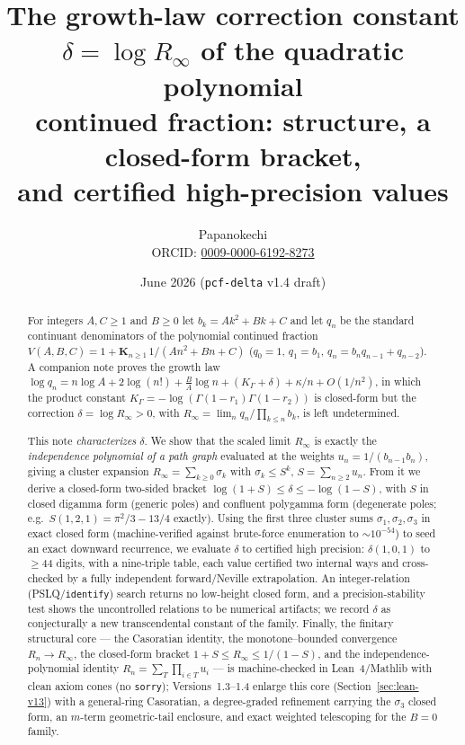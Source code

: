 \documentclass[11pt]{article}
\title{The growth-law correction constant\\
$\delta=\log R_\infty$ of the quadratic polynomial\\
continued fraction: structure, a closed-form bracket,\\
and certified high-precision values}
\author{Papanokechi\\
\small ORCID: \href{https://orcid.org/0009-0000-6192-8273}{0009-0000-6192-8273}}
\date{June 2026 \quad(\texttt{pcf-delta} v1.4 draft)}
\newcommand{\Rinf}{R_\infty}
\begin{document}
\maketitle

\begin{abstract}
For integers $A,C\ge1$ and $B\ge0$ let $b_k=Ak^2+Bk+C$ and let $q_n$ be the standard
continuant denominators of the polynomial continued fraction
$V(A,B,C)=1+\mathbf{K}_{n\ge1}\,1/(An^2+Bn+C)$ ($q_0=1$, $q_1=b_1$,
$q_n=b_nq_{n-1}+q_{n-2}$). A companion note proves the growth law
$\log q_n=n\log A+2\log(n!)+\tfrac{B}{A}\log n+(K_\Gamma+\delta)+\kappa/n+O(1/n^2)$,
in which the product constant $K_\Gamma=-\log(\Gamma(1-r_1)\Gamma(1-r_2))$ is
closed-form but the correction $\delta=\log\Rinf>0$, with
$\Rinf=\lim_n q_n/\prod_{k\le n}b_k$, is left undetermined.

This note \emph{characterizes} $\delta$. We show that the scaled limit $\Rinf$ is exactly
the \emph{independence polynomial of a path graph} evaluated at the weights
$u_n=1/(b_{n-1}b_n)$, giving a cluster expansion $\Rinf=\sum_{k\ge0}\sigma_k$ with
$\sigma_k\le S^k$, $S=\sum_{n\ge2}u_n$. From it we derive a closed-form two-sided
bracket $\log(1+S)\le\delta\le-\log(1-S)$, with $S$ in closed digamma form
(generic poles) and confluent polygamma form (degenerate poles; e.g.\
$S(1,2,1)=\pi^2/3-13/4$ exactly). Using the first three cluster sums
$\sigma_1,\sigma_2,\sigma_3$ in exact closed form (machine-verified against
brute-force enumeration to $\sim10^{-54}$) to seed an exact downward recurrence, we
evaluate $\delta$ to certified high precision: $\delta(1,0,1)$ to $\ge44$ digits,
with a nine-triple table, each value certified two internal ways and cross-checked
by a fully independent forward/Neville extrapolation. An integer-relation
(PSLQ/\texttt{identify}) search returns no low-height closed form, and a
precision-stability test shows the uncontrolled relations to be numerical
artifacts; we record $\delta$ as conjecturally a new transcendental constant of the
family. Finally, the finitary structural core --- the Casoratian identity, the
monotone--bounded convergence $R_n\to\Rinf$, the closed-form bracket
$1+S\le\Rinf\le1/(1-S)$, and the independence-polynomial identity
$R_n=\sum_T\prod_{i\in T}u_i$ --- is machine-checked in Lean~4/Mathlib with clean axiom
cones (no \texttt{sorry}); Versions~1.3--1.4 enlarge this core (Section~\ref{sec:lean-v13})
with a general-ring Casoratian, a degree-graded refinement carrying the $\sigma_3$ closed
form, an $m$-term geometric-tail enclosure, and exact weighted telescoping for the $B=0$
family.
\end{abstract}
\end{document}
